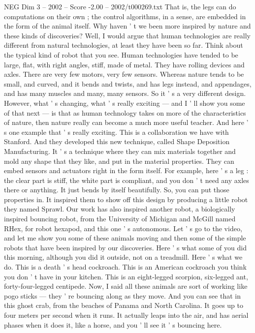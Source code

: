 \begin{textsample}{NEG Dim 3 – 2002 – Score -2.00 – 2002/t000269.txt}
That is, the legs can do computations on their own ; the control algorithms, in a sense, are embedded in the form of the animal itself.
Why haven ' t we been more inspired by nature and these kinds of discoveries?
Well, I would argue that human technologies are really different from natural technologies, at least they have been so far.
Think about the typical kind of robot that you see.
Human technologies have tended to be large, flat, with right angles, stiff, made of metal.
They have rolling devices and axles.
There are very few motors, very few sensors.
Whereas nature tends to be small, and curved, and it bends and twists, and has legs instead, and appendages, and has many muscles and many, many sensors.
So it ' s a very different design.
However, what ' s changing, what ' s really exciting — and I ' ll show you some of that next — is that as human technology takes on more of the characteristics of nature, then nature really can become a much more useful teacher.
And here ' s one example that ' s really exciting.
This is a collaboration we have with Stanford.
And they developed this new technique, called Shape Deposition Manufacturing.
It ' s a technique where they can mix materials together and mold any shape that they like, and put in the material properties.
They can embed sensors and actuators right in the form itself.
For example, here ' s a leg : the clear part is stiff, the white part is compliant, and you don ' t need any axles there or anything.
It just bends by itself beautifully.
So, you can put those properties in.
It inspired them to show off this design by producing a little robot they named Sprawl.
Our work has also inspired another robot, a biologically inspired bouncing robot, from the University of Michigan and McGill named RHex, for robot hexapod, and this one ' s autonomous.
Let ' s go to the video, and let me show you some of these animals moving and then some of the simple robots that have been inspired by our discoveries.
Here ' s what some of you did this morning, although you did it outside, not on a treadmill.
Here ' s what we do.
This is a death ' s head cockroach.
This is an American cockroach you think you don ' t have in your kitchen.
This is an eight-legged scorpion, six-legged ant, forty-four-legged centipede.
Now, I said all these animals are sort of working like pogo sticks — they ' re bouncing along as they move.
And you can see that in this ghost crab, from the beaches of Panama and North Carolina.
It goes up to four meters per second when it runs.
It actually leaps into the air, and has aerial phases when it does it, like a horse, and you ' ll see it ' s bouncing here.

\end{textsample}
